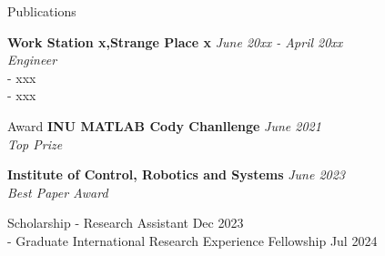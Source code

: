 \documentclass{resume} %
\begin{document}




\begin{rSection}{Publications}

{\bf Work Station x,Strange Place x} \hfill {\em June 20xx - April 20xx} 
\\{\textit{ Engineer}}
\\- xxx
\\- xxx


\end{rSection}

\begin{rSection}{Award}
{\bf INU MATLAB Cody Chanllenge} 
    \hfill 
    {\em June 2021} 
    \\
    {\textit {Top Prize}
} 

{\bf Institute of Control, Robotics and Systems} 
    \hfill 
    {\em June 2023} 
    \\
    {\textit {Best Paper Award}
} 

\end{rSection}

\begin{rSection}{Scholarship}
    - Research Assistant 
    \hfill 
    {Dec 2023} \\
    - Graduate International Research Experience Fellowship 
    \hfill 
    {Jul 2024} \\
\end{rSection}
    
\end{document}
